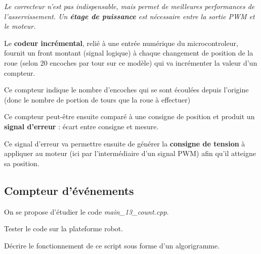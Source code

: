 \documentclass[a4paper,12pt,titlepage]{article} %
\begin{document}
\begin{center}
\end{center}

\textit{Le correcteur n'est pas indispensable, mais permet de meilleures performances de l'asservissement. Un \textbf{étage de puissance} est nécessaire entre la sortie PWM et le moteur.}

\medskip

Le \textbf{codeur incrémental}, relié à une entrée numérique du microcontroleur, fournit un front montant (signal logique) à chaque changement de position de la roue (selon 20 encoches par tour sur ce modèle) qui va incrémenter la valeur d'un compteur.

Ce compteur indique le nombre d'encoches qui se sont écoulées depuis l'origine (donc le nombre de portion de tours que la roue à effectuer)

Ce compteur peut-être ensuite comparé à une consigne de position et produit un \textbf{signal d'erreur} : écart entre consigne et mesure.

Ce signal d'erreur va permettre ensuite de générer la \textbf{consigne de tension} à appliquer au moteur (ici par l'intermédiaire d'un signal PWM) afin qu'il atteigne sa position.

\subsection{Compteur d'événements}

On se propose d'étudier le code \textsl{main\_13\_count.cpp}.

\Manip Tester le code sur la plateforme robot.

\Quest Décrire le fonctionnement de ce script sous forme d'un algorigramme. 
\end{document}
